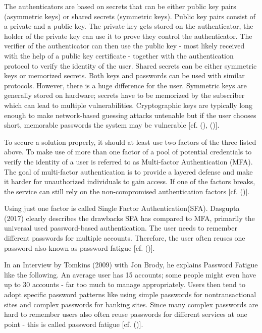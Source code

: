 The authenticators are based on secrets that can be either public key pairs (asymmetric keys) or shared secrets (symmetric keys). Public key pairs consist of a private and a public key. The private key gets stored on the authenticator, the holder of the private key can use it to prove they control the authenticator. The verifier of the authenticator can then use the public key - most likely received with the help of a public key certificate - together with the authentication protocol to verify the identity of the user. Shared secrets can be either symmetric keys or memorized secrets. Both keys and passwords can be used with similar protocols. However, there is a huge difference for the user. Symmetric keys are generally stored on hardware; secrets have to be memorized by the subscriber which can lead to multiple vulnerabilities. Cryptographic keys are typically long enough to make network-based guessing attacks untenable but if the user chooses short, memorable passwords the system may be vulnerable [cf. (\cite{NIST:2017:DIG}), (\cite{Dasgupta:2017:AUA})]. 


To secure a solution properly, it should at least use two factors of the three listed above. To make use of more than one factor of a pool of potential credentials to verify the identity of a user is referred to as Multi-factor Authentication (MFA). The goal of multi-factor authentication is to provide a layered defense and make it harder for unauthorized individuals to gain access. If one of the factors breaks, the service can still rely on the non-compromised authentication factors [cf. (\cite{Dasgupta:2017:AUA})].

Using just one factor is called Single Factor Authentication(SFA). Dasgupta (2017) clearly describes the drawbacks SFA has compared to MFA, primarily the universal used password-based authentication. The user needs to remember different passwords for multiple accounts. Therefore, the user often reuses one password also known as password fatigue [cf. (\cite{Dasgupta:2017:AUA})].

In an Interview by Tomkins (2009) with Jon Brody, he explains Password Fatigue like the following. An average user has 15 accounts; some people might even have up to 30 accounts - far too much to manage appropriately. Users then tend to adopt specific password patterns like using simple passwords for nontransactional sites and complex passwords for banking sites. Since many complex passwords are hard to remember users also often reuse passwords for different services at one point - this is called password fatigue [cf. (\cite{Tomkins:2009:DPF})]. 

